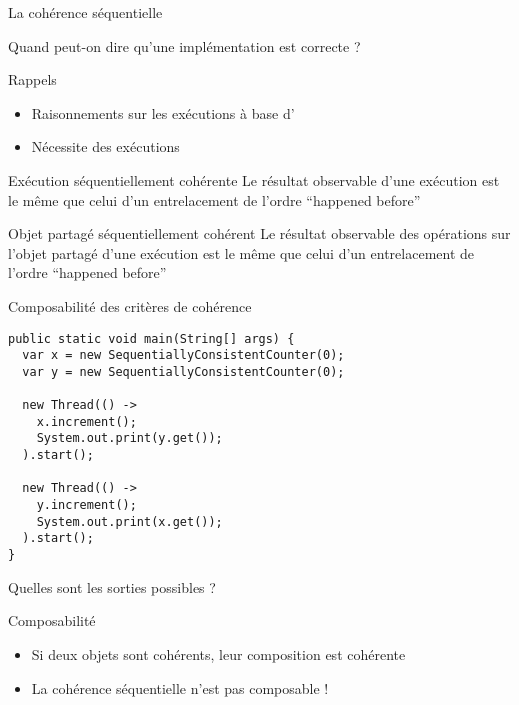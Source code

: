 \mode*

\begin{frame}[fragile]{La cohérence séquentielle}

\vfill
\begin{center}
   \alert{Quand peut-on dire qu'une implémentation est \alert{correcte} ?}
\end{center}    

\vfill
\begin{block}{Rappels}
  \begin{itemize}
  \item Raisonnements sur les exécutions à base d'
  \item Nécessite des exécutions 
  \end{itemize}
\end{block}
\vfill

\begin{block}{Exécution séquentiellement cohérente}
  Le résultat observable d'une exécution est le même que celui d'un entrelacement de l'ordre ``happened before''
\end{block}

\pause

\vfill
\begin{block}{Objet partagé séquentiellement cohérent}
  Le résultat observable \alert{des opérations sur l'objet partagé} d'une exécution est le même que celui d'un entrelacement de l'ordre ``happened before''
\end{block}
\vfill

\end{frame}

\begin{frame}[fragile]{Composabilité des critères de cohérence}
    \begin{lstlisting}[numbers=none]
public static void main(String[] args) {    
  var x = new SequentiallyConsistentCounter(0);
  var y = new SequentiallyConsistentCounter(0);
   
  new Thread(() ->
    x.increment();
    System.out.print(y.get());
  ).start();
   
  new Thread(() ->
    y.increment();
    System.out.print(x.get());
  ).start();
}
    \end{lstlisting}

\vspace{-3mm}
\begin{center}
  \color{exampleColor} Quelles sont les sorties possibles ? 
\end{center}
\pause
\begin{block}{Composabilité}
   \begin{itemize}
      \item Si deux objets sont cohérents, leur composition est cohérente 
      \item \alert{La cohérence séquentielle n'est pas composable !}
   \end{itemize}
\end{block}
\end{frame}


